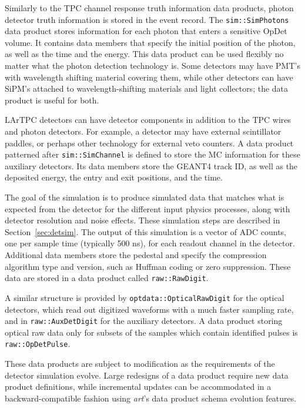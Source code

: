 \documentclass[12pt]{elsarticle}
\begin{document}
Similarly to the TPC channel response truth information data products, photon detector truth information
is stored in the event record.  The {\tt sim::SimPhotons} data product stores information for each photon
that enters a sensitive OpDet volume.  It contains data members that specify the initial position of the
photon, as well as the time and the energy.    
This data product can be used flexibly no matter what the photon detection technology is.  Some detectors
may have PMT's with wavelength shifting material covering them, while other detectors can have SiPM's attached
to wavelength-shifting materials and light collectors; the data product is useful for both.

LArTPC detectors can have detector components in addition to the TPC wires and photon detectors.
For example, a detector may have external scintillator paddles, or perhaps other technology for external veto
counters.   A data product patterned after {\tt sim::SimChannel} is defined to store the MC information
for these auxiliary detectors.  Its data members store the GEANT4 track ID, as well as the deposited energy, the entry and exit positions,
and the time.

The goal of the simulation is to produce simulated data that matches what is expected from the detector for
the different input physics processes, along with detector resolution and noise effects.  These simulation
steps are described in Section~\ref{sec:detsim}.  The output of this simulation is a vector of ADC counts,
one per sample time (typically 500 ns), for each readout channel in the detector.  Additional data members
store the pedestal and specify the compression algorithm type and version, such as Huffman coding or zero 
suppression.   These data are stored in a data product called {\tt raw::RawDigit}.

A similar structure is provided by {\tt optdata::OpticalRawDigit} for the optical detectors, which read out
digitized waveforms with a much faster sampling rate, and in
{\tt raw::AuxDetDigit} for the auxiliary detectors.  A data product storing optical raw data only for 
subsets of the samples which contain identified pulses is {\tt raw::OpDetPulse}.

These data products are subject to modification as the requirements of the detector simulation evolve.
Large redesigns of a data product require new data product definitions, while
incremental updates can be accommodated in a backward-compatible fashion using {\it art}'s 
data product schema evolution features.
\end{document}
